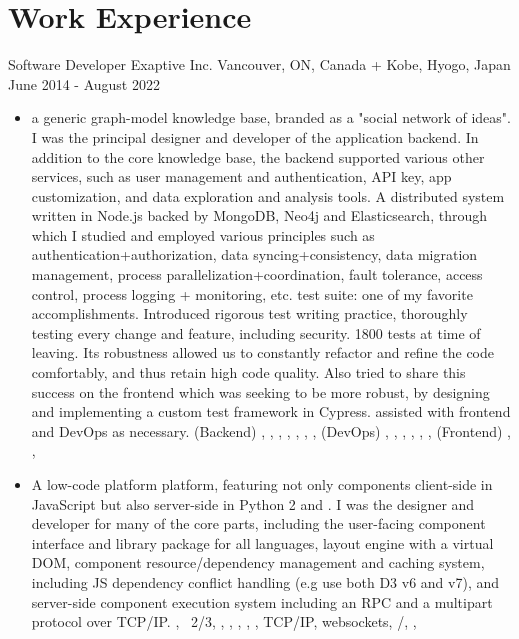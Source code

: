\section{Work Experience}

\cventry
  {Software Developer} %
  {Exaptive Inc.} %
  {Vancouver, ON, Canada + Kobe, Hyogo, Japan} %
  {June 2014 - August 2022} %
  {
    \begin{itemize} %
      \liststyle
      \item { a generic graph-model knowledge base, branded as a "social network of ideas".
        I was the principal designer and developer of the application backend.
        In addition to the core knowledge base, the backend supported various other services, 
        such as user management and authentication, API key, app customization, and data exploration and analysis tools.
        A distributed system written in Node.js backed by MongoDB, Neo4j and Elasticsearch, through which I studied and employed various principles such as 
        authentication+authorization, 
        data syncing+consistency, 
        data migration management,
        process parallelization+coordination, 
        fault tolerance, 
        access control, 
        process logging + monitoring, 
        etc.
        \tgsubitem test suite: one of my favorite accomplishments. Introduced rigorous test writing practice, thoroughly testing every change and feature, including security. 
        1800 tests at time of leaving. 
        Its robustness allowed us to constantly refactor and refine the code comfortably, and thus retain high code quality. 
        Also tried to share this success on the frontend which was seeking to be more robust, by designing and implementing a custom test framework in Cypress.
        \tgsubitem assisted with frontend and DevOps as necessary. 
        \tgskills (Backend) \rfnodejs, \rfmongodb, \rfneofj, \rfredis, \rfelastic, \rfbash, \rfdocker, 
        (DevOps) \rfjenkins, \rfaws, \rfansible, \rfterraform, \rfnewrelic, \rfsumologic,
        (Frontend) \rftypescript, \rfreact, \rfcypress
      }

      \item {
         A low-code platform platform, featuring not only components client-side in JavaScript but also server-side in Python 2 and \rfrlang.
        I was the designer and developer for many of the core parts, including 
        the user-facing component interface and library package for all languages, 
        layout engine with a virtual DOM,
        component resource/dependency management and caching system, including JS dependency conflict handling (e.g use both D3 v6 and v7),
        and 
        server-side component execution system including an RPC and a multipart protocol over TCP/IP.
        \tgskills  \rfjavascript, \rfpython\ 2/3, \rfclang, \rfphp, \rfmysql, \rfredis, \rfdocker, TCP/IP, websockets, \rfhtml/\rfcss, \rfaws, \rfdthree
      }
    \end{itemize}
  }

